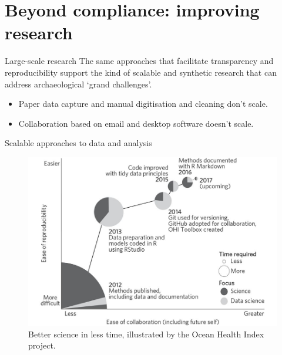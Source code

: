 \documentclass[aspectratio=169, 11pt]{beamer} %
\begin{document}
\section{Beyond compliance: improving research}

\begin{frame}{Large-scale research}
    The same approaches that facilitate transparency and reproducibility support the kind of scalable and synthetic research that can address archaeological `grand challenges'. \cite{Kintigh2014-ub}
        \begin{itemize}[label=\textbullet]
            \item Paper data capture and manual digitisation and cleaning don't scale.
            \item Collaboration based on email and desktop software doesn't scale.
    \end{itemize}
\end{frame}

\begin{frame}{Scalable approaches to data and analysis}
  \begin{figure}[H]
    \centering
        \includegraphics[height=.7\textheight]{figures/Ocean-Health-Index.jpg}
        \caption{Better science in less time, illustrated by the Ocean Health Index project. \cite{Stewart_Lowndes2017-lj}}
        \label{fig:stewart_lowndes}
  \end{figure}
\end{frame}
\end{document}
